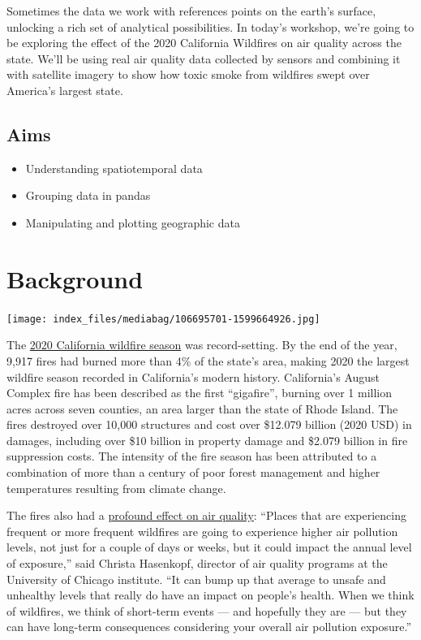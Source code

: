 \documentclass[
  letterpaper,
  DIV=11,
  numbers=noendperiod]{scrreprt}
\providecommand{\tightlist}{%
  \setlength{\itemsep}{0pt}\setlength{\parskip}{0pt}}\usepackage{longtable,booktabs,array}
\begin{document}
Sometimes the data we work with references points on the earth's
surface, unlocking a rich set of analytical possibilities. In today's
workshop, we're going to be exploring the effect of the 2020 California
Wildfires on air quality across the state. We'll be using real air
quality data collected by sensors and combining it with satellite
imagery to show how toxic smoke from wildfires swept over America's
largest state.

\hypertarget{aims-1}{%
\subsection{Aims}\label{aims-1}}

\begin{itemize}
\tightlist
\item
  Understanding spatiotemporal data
\item
  Grouping data in pandas
\item
  Manipulating and plotting geographic data
\end{itemize}

\hypertarget{background}{%
\section{Background}\label{background}}

\texttt{[image: index\_files/mediabag/106695701-1599664926.jpg]}

The \href{https://en.wikipedia.org/wiki/2020_California_wildfires}{2020
California wildfire season} was record-setting. By the end of the year,
9,917 fires had burned more than 4\% of the state's area, making 2020
the largest wildfire season recorded in California's modern history.
California's August Complex fire has been described as the first
``gigafire'', burning over 1 million acres across seven counties, an
area larger than the state of Rhode Island. The fires destroyed over
10,000 structures and cost over \$12.079 billion (2020 USD) in damages,
including over \$10 billion in property damage and \$2.079 billion in
fire suppression costs. The intensity of the fire season has been
attributed to a combination of more than a century of poor forest
management and higher temperatures resulting from climate change.

The fires also had a
\href{https://epic.uchicago.edu/news/pollution-from-californias-2020-wildfires-likely-offset-decades-of-air-quality-gains/}{profound
effect on air quality}: ``Places that are experiencing frequent or more
frequent wildfires are going to experience higher air pollution levels,
not just for a couple of days or weeks, but it could impact the annual
level of exposure,'' said Christa Hasenkopf, director of air quality
programs at the University of Chicago institute. ``It can bump up that
average to unsafe and unhealthy levels that really do have an impact on
people's health. When we think of wildfires, we think of short-term
events --- and hopefully they are --- but they can have long-term
consequences considering your overall air pollution exposure.''
\end{document}
